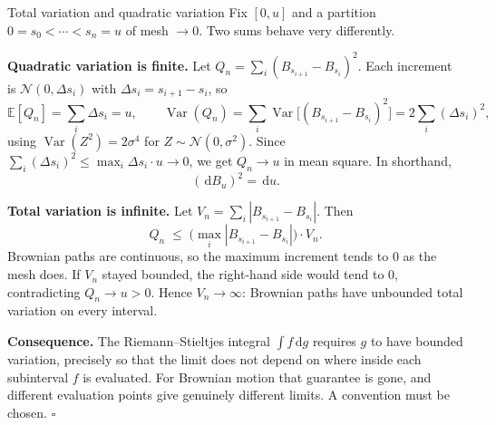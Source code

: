 \documentclass[11pt,a4paper]{article}
\newcommand{\E}{\mathbb{E}}
\newcommand{\N}{\mathcal{N}}
\newcommand{\Var}{\operatorname{Var}}
\newcommand{\dd}{\,\mathrm d}
\newcounter{toolbox}
\begin{document}
\begin{toolbox}{Total variation and quadratic variation}\label{tb:variation}
Fix $[0,u]$ and a partition $0=s_0<\cdots<s_n=u$ of mesh $\to0$. Two sums behave very
differently.

\textbf{Quadratic variation is finite.} Let
$Q_n=\sum_i(B_{s_{i+1}}-B_{s_i})^2$. Each increment is $\N(0,\Delta s_i)$ with
$\Delta s_i=s_{i+1}-s_i$, so
\[
 \E[Q_n]=\sum_i\Delta s_i=u,
 \qquad
 \Var(Q_n)=\sum_i\Var\big[(B_{s_{i+1}}-B_{s_i})^2\big]=2\sum_i(\Delta s_i)^2,
\]
using $\Var(Z^2)=2\sigma^4$ for $Z\sim\N(0,\sigma^2)$. Since
$\sum_i(\Delta s_i)^2\le\max_i\Delta s_i\cdot u\to0$, we get $Q_n\to u$ in mean square. In
shorthand,
\[
 \boxed{(\dd B_u)^2=\dd u.}
\]

\textbf{Total variation is infinite.} Let $V_n=\sum_i|B_{s_{i+1}}-B_{s_i}|$. Then
\[
 Q_n\;\le\;\Big(\max_i|B_{s_{i+1}}-B_{s_i}|\Big)\cdot V_n .
\]
Brownian paths are continuous, so the maximum increment tends to $0$ as the mesh does. If
$V_n$ stayed bounded, the right-hand side would tend to $0$, contradicting $Q_n\to u>0$.
Hence $V_n\to\infty$: Brownian paths have unbounded total variation on every interval.

\textbf{Consequence.} The Riemann--Stieltjes integral $\int f\dd g$ requires $g$ to have
bounded variation, precisely so that the limit does not depend on where inside each
subinterval $f$ is evaluated. For Brownian motion that guarantee is gone, and different
evaluation points give genuinely different limits. A convention must be chosen.
\hfill$\square$
\end{toolbox}
\end{document}
